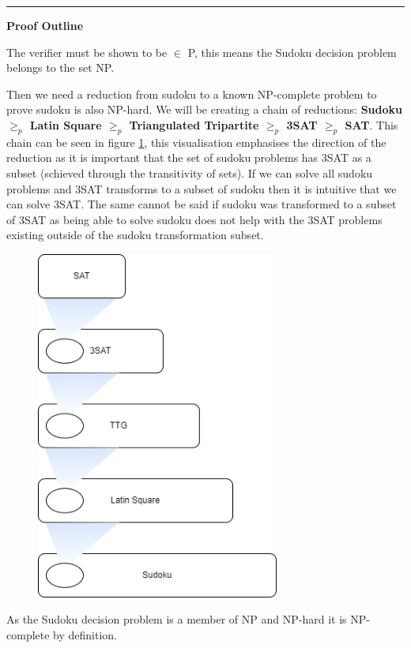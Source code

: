 \documentclass[a4paper,11pt]{report}
\begin{document}
\noindent\rule{4cm}{0.4pt}

\textbf{Proof Outline}

The verifier must be shown to be $\in$ P, this means the Sudoku decision problem belongs to the set NP.

Then we need a reduction from sudoku to a known NP-complete problem to prove sudoku is also NP-hard. We will be creating a chain of reductions: \textbf{Sudoku $\geq_p$ Latin Square $\geq_p$ Triangulated Tripartite $\geq_p$ 3SAT $\geq_p$ SAT}. This chain can be seen in figure \ref{fig:sudokureduction}, this visualisation emphasises the direction of the reduction as it is important that the set of sudoku problems has 3SAT as a subset (schieved through the transitivity of sets). If we can solve all sudoku problems and 3SAT transforms to a subset of sudoku then it is intuitive that we can solve 3SAT. The same cannot be said if sudoku was transformed to a subset of 3SAT as being able to solve sudoku does not help with the 3SAT problems existing outside of the sudoku transformation subset.  

\begin{figure}[h!]
	\begin{center}
		\includegraphics[width=80mm]{figures/subset.png}
	\end{center}
	\caption{\label{fig:sudokureduction}}
\end{figure}

As the Sudoku decision problem is a member of NP and NP-hard it is NP-complete by definition.
\end{document}
